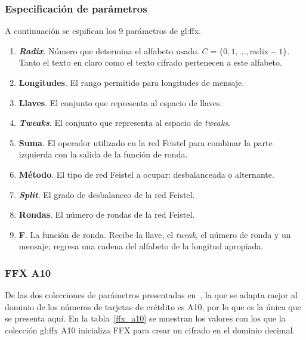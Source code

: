 \subsubsection{Especificación de parámetros}

A continuación se espifican los 9 parámetros de \gls{gl:ffx}.

\begin{enumerate}

  \item \textbf{\textit{Radix}}.
    Número que determina el alfabeto usado.
    $ C = \{ 0, 1, \dots, \text{radix} - 1\} $. Tanto el texto en claro como
    el texto cifrado pertenecen a este alfabeto.

  \item \textbf{Longitudes}.
    El rango permitido para longitudes de mensaje.

  \item \textbf{Llaves}.
    El conjunto que representa al espacio de llaves.

  \item \textbf{\textit{Tweaks}}.
    El conjunto que representa al espacio de \textit{tweaks}.

  \item \textbf{Suma}.
    El operador utilizado en la red Feistel para combinar la parte izquierda
    con la salida de la función de ronda.

  \item \textbf{Método}.
    El tipo de red Feistel a ocupar: desbalanceada o alternante.

  \item \textbf{\textit{Split}}.
    El grado de desbalanceo de la red Feistel.

  \item \textbf{Rondas}.
    El número de rondas de la red Feistel.

  \item \textbf{F}.
    La función de ronda. Recibe la llave, el \textit{tweak}, el número de
    ronda y un mensaje; regresa una cadena del alfabeto de la longitud
    apropiada.

\end{enumerate}

\subsubsection{FFX A10}

De las dos colecciones de parámetros presentadas en~\cite{ffx_2}, la que se
adapta mejor al dominio de los números de tarjetas de crétdito es A10, por lo
que es la única que se presenta aquí. En la tabla~\ref{ffx_a10} se muestran los
valores con los que la colección \gls{gl:ffx} A10 inicializa FFX para crear un
cifrado en el dominio decimal.

